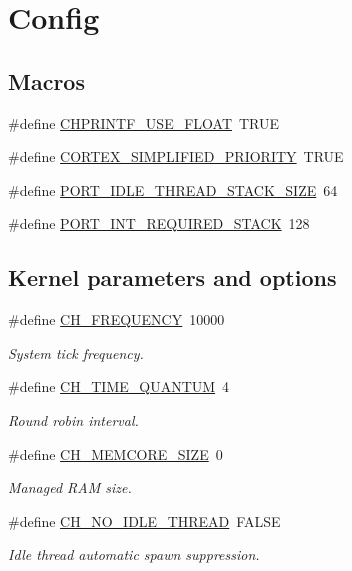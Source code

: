 \hypertarget{group__config}{}\section{Config}
\label{group__config}
\subsection*{Macros}
\begin{DoxyCompactItemize}
\item 
\#define \hyperlink{group__config_ga92e0819075bd91dc380cc86a20186960}{C\+H\+P\+R\+I\+N\+T\+F\+\_\+\+U\+S\+E\+\_\+\+F\+L\+O\+A\+T}~T\+R\+U\+E
\item 
\#define \hyperlink{group__config_ga4b0ac77530f0e572b47fb57a00665d1c}{C\+O\+R\+T\+E\+X\+\_\+\+S\+I\+M\+P\+L\+I\+F\+I\+E\+D\+\_\+\+P\+R\+I\+O\+R\+I\+T\+Y}~T\+R\+U\+E
\item 
\#define \hyperlink{group__config_ga7eb4a4369c2d2fe0d2f0214ddc56d78a}{P\+O\+R\+T\+\_\+\+I\+D\+L\+E\+\_\+\+T\+H\+R\+E\+A\+D\+\_\+\+S\+T\+A\+C\+K\+\_\+\+S\+I\+Z\+E}~64
\item 
\#define \hyperlink{group__config_ga05a9c892ced18dda34b086372a0c49ea}{P\+O\+R\+T\+\_\+\+I\+N\+T\+\_\+\+R\+E\+Q\+U\+I\+R\+E\+D\+\_\+\+S\+T\+A\+C\+K}~128
\end{DoxyCompactItemize}
\subsection*{Kernel parameters and options}
\begin{DoxyCompactItemize}
\item 
\#define \hyperlink{group__config_ga195ab8ff3340a18d4513cbaf915078f2}{C\+H\+\_\+\+F\+R\+E\+Q\+U\+E\+N\+C\+Y}~10000
\begin{DoxyCompactList}\small\item\em System tick frequency. \end{DoxyCompactList}\item 
\#define \hyperlink{group__config_ga3c6800242611cf244a38c4a870e8515a}{C\+H\+\_\+\+T\+I\+M\+E\+\_\+\+Q\+U\+A\+N\+T\+U\+M}~4
\begin{DoxyCompactList}\small\item\em Round robin interval. \end{DoxyCompactList}\item 
\#define \hyperlink{group__config_gac73902e3c40b375483f9dde71e83253d}{C\+H\+\_\+\+M\+E\+M\+C\+O\+R\+E\+\_\+\+S\+I\+Z\+E}~0
\begin{DoxyCompactList}\small\item\em Managed R\+A\+M size. \end{DoxyCompactList}\item 
\#define \hyperlink{group__config_gac7ceed3b75958cb6f7a977aab5ee249f}{C\+H\+\_\+\+N\+O\+\_\+\+I\+D\+L\+E\+\_\+\+T\+H\+R\+E\+A\+D}~F\+A\+L\+S\+E
\begin{DoxyCompactList}\small\item\em Idle thread automatic spawn suppression. \end{DoxyCompactList}\end{DoxyCompactItemize}

